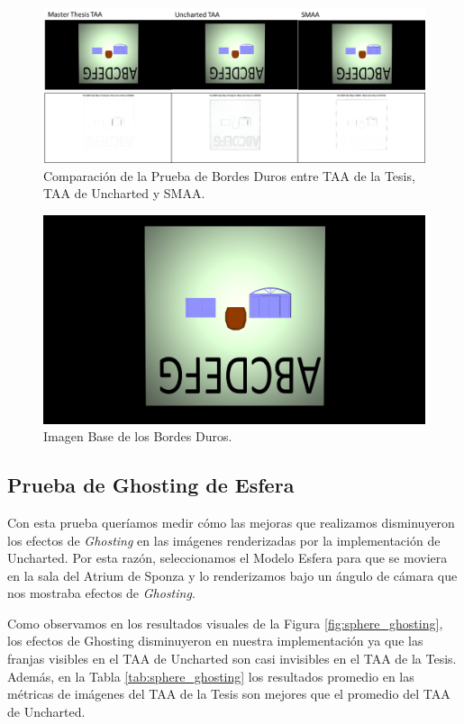 \documentclass[pregrado]{tesis-usb} %
\begin{document}
\begin{figure}[!htb]
	\centering
	\includegraphics[scale=0.9]{images/results/hard_test.png}
	\caption{Comparación de la Prueba de Bordes Duros entre TAA de la Tesis, TAA de Uncharted y SMAA.}\label{fig:hard_test_render}
\end{figure}

\begin{figure}[!htb]
	\centering
	\includegraphics[scale=0.09]{images/results/hard_test_sobel_ground_truth.png}
	\caption{Imagen Base de los Bordes Duros.}\label{fig:hard_test_truth}
\end{figure}

\FloatBarrier

\subsection{Prueba de Ghosting de Esfera}
Con esta prueba queríamos medir cómo las mejoras que realizamos disminuyeron los efectos de \textit{Ghosting} en las imágenes renderizadas por la implementación de Uncharted. Por esta razón, seleccionamos el Modelo Esfera para que se moviera en la sala del Atrium de Sponza y lo renderizamos bajo un ángulo de cámara que nos mostraba efectos de \textit{Ghosting}.

Como observamos en los resultados visuales de la Figura \ref{fig:sphere_ghosting}, los efectos de  Ghosting disminuyeron en nuestra implementación ya que las franjas visibles en el TAA de Uncharted son casi invisibles en el TAA de la Tesis. Además, en la Tabla \ref{tab:sphere_ghosting} los resultados promedio en las métricas de imágenes del TAA de la Tesis son mejores que el promedio del TAA de Uncharted.
\end{document}
